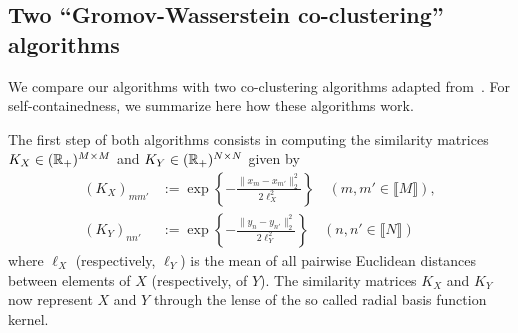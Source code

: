 \subsection{Two ``Gromov-Wasserstein co-clustering'' algorithms}
\label{subsec:Laclau}
We  compare   our  algorithms   with  two  co-clustering   algorithms  adapted
from~\cite{Laclau17}.   For self-containedness,  we summarize  here how  these
algorithms work.

The  first  step of  both  algorithms  consists  in computing  the  similarity
matrices       $K_{X}       \in        (\mathbb{R}_{+})^{M\times       M}$       and
$K_{Y} \in (\mathbb{R}_{+})^{N\times N}$ given by
\begin{align*}
  (K_{X})_{mm'}
  &  :=  \exp\left\{-\frac{\|x_{m}  -  x_{m'}\|_{2}^{2}}{2\ell_{X}^{2}}\right\}
    \quad (m, m'\in\llbracket M\rrbracket),\\
  (K_{Y})_{nn'}
  &  :=  \exp\left\{-\frac{\|y_{n}  -  y_{n'}\|_{2}^{2}}{2\ell_{Y}^{2}}\right\}
    \quad (n,n '\in\llbracket N\rrbracket)
\end{align*}
where  $\ell_{X}$  (respectively, $\ell_{Y}$)  is  the  mean of  all  pairwise
Euclidean  distances between  elements  of $X$  (respectively,  of $Y$).   The
similarity matrices $K_{X}$ and $K_{Y}$ now  represent $X$ and $Y$ through the
lense of the so called radial basis function kernel.

